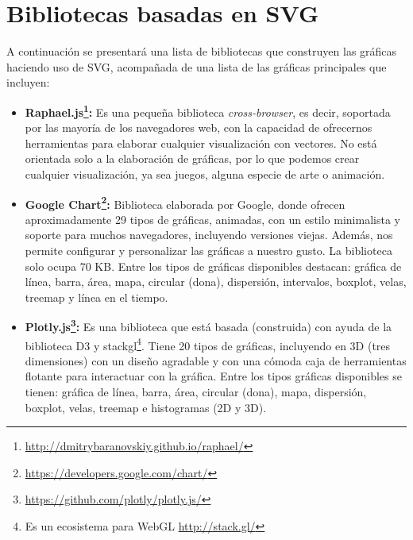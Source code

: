 \section{Bibliotecas basadas en SVG}
A continuación se presentará una lista de bibliotecas que construyen las gráficas haciendo uso de SVG, acompañada de una lista de las gráficas principales que incluyen:
\\[10pt]
\begin{itemize}
\item\textbf{Raphael.js\footnote{\url{http://dmitrybaranovskiy.github.io/raphael/}}:}
Es una pequeña biblioteca \textit{cross-browser}, es decir, soportada por las mayoría de los navegadores web, con la capacidad de ofrecernos herramientas para elaborar cualquier visualización con vectores. No está orientada solo a la elaboración de gráficas, por lo que podemos crear cualquier visualización, ya sea juegos, alguna especie de arte o animación.
\item\textbf{Google Chart\footnote{\url{https://developers.google.com/chart/}}:}
Biblioteca elaborada por Google, donde ofrecen aproximadamente 29 tipos de gráficas, animadas, con un estilo minimalista y soporte para muchos navegadores, incluyendo versiones viejas. Además, nos permite configurar y personalizar las gráficas a nuestro gusto. La biblioteca solo ocupa 70 KB. Entre los tipos de gráficas disponibles destacan: gráfica de línea, barra, área, mapa, circular (dona), dispersión, intervalos, boxplot, velas, treemap y línea en el tiempo.
\item\textbf{Plotly.js\footnote{\url{https://github.com/plotly/plotly.js/}}:}
Es una biblioteca que está basada (construida) con ayuda de la biblioteca D3 y stackgl\footnote{Es un ecosistema para WebGL \url{http://stack.gl/}}. Tiene 20 tipos de gráficas, incluyendo en 3D (tres dimensiones) con un diseño agradable y con una cómoda caja de herramientas flotante para interactuar con la gráfica. Entre los tipos gráficas disponibles se tienen: gráfica de línea, barra, área, circular (dona), mapa, dispersión, boxplot, velas, treemap e histogramas (2D y 3D).
\\[15pt]
\end{itemize}

